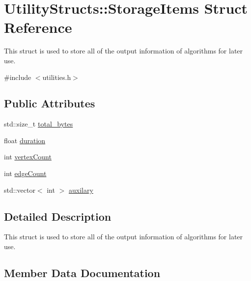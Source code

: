 \hypertarget{struct_utility_structs_1_1_storage_items}{}\section{Utility\+Structs\+:\+:Storage\+Items Struct Reference}
\label{struct_utility_structs_1_1_storage_items}


This struct is used to store all of the output information of algorithms for later use.  




{\ttfamily \#include $<$utilities.\+h$>$}

\subsection*{Public Attributes}
\begin{DoxyCompactItemize}
\item 
std\+::size\+\_\+t \hyperlink{struct_utility_structs_1_1_storage_items_a39cf482db54d8e6ac473b438444c8a1e}{total\+\_\+bytes}
\item 
float \hyperlink{struct_utility_structs_1_1_storage_items_a65e7df5611a4e144cc27576bd3041f6c}{duration}
\item 
int \hyperlink{struct_utility_structs_1_1_storage_items_af72522be713f23fcfe3ac66780183fda}{vertex\+Count}
\item 
int \hyperlink{struct_utility_structs_1_1_storage_items_afafcba9bb103108e2c1e1d9254fb75c5}{edge\+Count}
\item 
std\+::vector$<$ int $>$ \hyperlink{struct_utility_structs_1_1_storage_items_afb9d346eaacb1c5e7f60f559c45910f2}{auxilary}
\end{DoxyCompactItemize}


\subsection{Detailed Description}
This struct is used to store all of the output information of algorithms for later use. 

\subsection{Member Data Documentation}
\mbox{\label{struct_utility_structs_1_1_storage_items_afb9d346eaacb1c5e7f60f559c45910f2}} 
